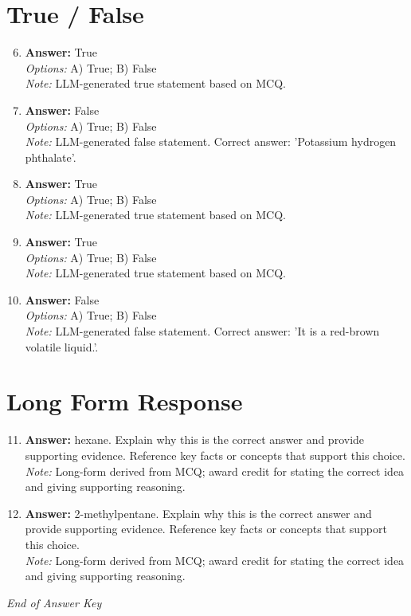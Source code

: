 \documentclass[12pt]{article}
\begin{document}
\section*{True / False}
\begin{enumerate}[label=\arabic*.]
\setcounter{enumi}{5}
\item \textbf{Answer:} True
\\ \textit{Options:} A) True; B) False
\\ \textit{Note:} LLM-generated true statement based on MCQ.
\item \textbf{Answer:} False
\\ \textit{Options:} A) True; B) False
\\ \textit{Note:} LLM-generated false statement. Correct answer: 'Potassium hydrogen phthalate'.
\item \textbf{Answer:} True
\\ \textit{Options:} A) True; B) False
\\ \textit{Note:} LLM-generated true statement based on MCQ.
\item \textbf{Answer:} True
\\ \textit{Options:} A) True; B) False
\\ \textit{Note:} LLM-generated true statement based on MCQ.
\item \textbf{Answer:} False
\\ \textit{Options:} A) True; B) False
\\ \textit{Note:} LLM-generated false statement. Correct answer: 'It is a red-brown volatile liquid.'.
\end{enumerate}

\section*{Long Form Response}
\begin{enumerate}[label=\arabic*.]
\setcounter{enumi}{10}
\item \textbf{Answer:} hexane. Explain why this is the correct answer and provide supporting evidence. Reference key facts or concepts that support this choice.
\\ \textit{Note:} Long-form derived from MCQ; award credit for stating the correct idea and giving supporting reasoning.
\item \textbf{Answer:} 2-methylpentane. Explain why this is the correct answer and provide supporting evidence. Reference key facts or concepts that support this choice.
\\ \textit{Note:} Long-form derived from MCQ; award credit for stating the correct idea and giving supporting reasoning.
\end{enumerate}

\vfill
\noindent\textit{End of Answer Key}
\end{document}
